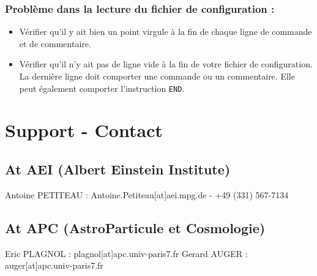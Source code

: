 \documentclass[a4paper,english,12pt]{article}
\begin{document}
\subsubsection{Probl\`eme dans la lecture du fichier de configuration :}
\label{SSSErrLect}
\begin{itemize}
\item V\'erifier qu'il y ait bien un point virgule \`a la fin de chaque  ligne de commande et de commentaire.
\item V\'erifier qu'il n'y ait pas  de ligne vide \`a la fin de votre fichier de configuration. La derni\`ere ligne doit comporter une commande ou un commentaire. Elle peut \'egalement comporter l'instruction \texttt{END}.
\end{itemize}

\section{Support - Contact}
\label{SSupport}
\subsection{At AEI (Albert Einstein Institute)}
\label{SSSupAEI}
Antoine PETITEAU : Antoine.Petiteau[at]aei.mpg.de  - +49 (331) 567-7134 \\

\subsection{At APC (AstroParticule et Cosmologie)}
\label{SSSupAPC}
Eric PLAGNOL : plagnol[at]apc.univ-paris7.fr 
Gerard AUGER : auger[at]apc.univ-paris7.fr 





%
\end{document}
